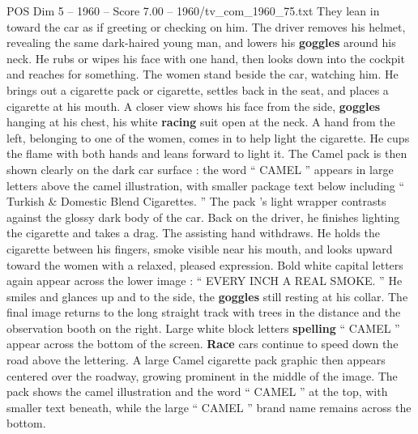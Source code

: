 \begin{textsample}{POS Dim 5 – 1960 – Score 7.00 – 1960/tv\_com\_1960\_75.txt}
They lean in toward the car as if greeting or checking on him.
The driver removes his helmet, revealing the same dark-haired young man, and lowers his \textbf{goggles} around his neck.
He rubs or wipes his face with one hand, then looks down into the cockpit and reaches for something.
The women stand beside the car, watching him.
He brings out a cigarette pack or cigarette, settles back in the seat, and places a cigarette at his mouth.
A closer view shows his face from the side, \textbf{goggles} hanging at his chest, his white \textbf{racing} suit open at the neck.
A hand from the left, belonging to one of the women, comes in to help light the cigarette.
He cups the flame with both hands and leans forward to light it.
The Camel pack is then shown clearly on the dark car surface : the word “ CAMEL ” appears in large letters above the camel illustration, with smaller package text below including “ Turkish \& Domestic Blend Cigarettes. ” The pack ’s light wrapper contrasts against the glossy dark body of the car.
Back on the driver, he finishes lighting the cigarette and takes a drag.
The assisting hand withdraws.
He holds the cigarette between his fingers, smoke visible near his mouth, and looks upward toward the women with a relaxed, pleased expression.
Bold white capital letters again appear across the lower image : “ EVERY INCH A REAL SMOKE. ” He smiles and glances up and to the side, the \textbf{goggles} still resting at his collar.
The final image returns to the long straight track with trees in the distance and the observation booth on the right.
Large white block letters \textbf{spelling} “ CAMEL ” appear across the bottom of the screen. \textbf{Race} cars continue to speed down the road above the lettering.
A large Camel cigarette pack graphic then appears centered over the roadway, growing prominent in the middle of the image.
The pack shows the camel illustration and the word “ CAMEL ” at the top, with smaller text beneath, while the large “ CAMEL ” brand name remains across the bottom.

\end{textsample}
